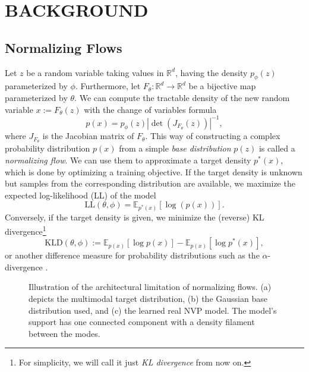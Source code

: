 \documentclass[twoside]{article}
\newcommand{\KLD}{\mathrm{KLD}}
\begin{document}
\section{BACKGROUND}

\subsection{Normalizing Flows}
\label{sec:back_nf}

Let $z$ be a random variable taking values in $\mathds{R}^d$, having the density $p_\phi(z)$ parameterized by $\phi$. Furthermore, let $F_\theta:\mathds{R}^d \rightarrow \mathds{R}^d$ be a bijective map parameterized by $\theta$. We can compute the tractable density of the new random variable $x := F_\theta(z)$ with the change of variables formula
\begin{equation}
	p(x) = p_\phi(z) \left| \det(J_{F_\theta}(z))\right| ^{-1},
\end{equation}
where $J_{F_\theta}$ is the Jacobian matrix of $F_\theta$. This way of constructing a complex probability distribution $p(x)$ from a simple \emph{base distribution} $p(z)$ is called a \emph{normalizing flow}. We can use them to approximate a target density $p^*(x)$, which is done by optimizing a training objective. If the target density is unknown but samples from the corresponding distribution are available, we maximize the expected log-likelihood (LL) of the model
\begin{equation}
    \text{LL}(\theta, \phi) = \mathds{E}_{p^*(x)}\left[ \log\left( p(x)\right) \right].
    \label{equ:def_ll}
\end{equation}
Conversely, if the target density is given, we minimize the (reverse) KL divergence\footnote{For simplicity, we will call it just \emph{KL divergence} from now on.} \citep{Papamakarios2021}
\begin{equation}
    \KLD(\theta, \phi) := \mathds{E}_{p(x)}\left[ \log p(x) \right] - \mathds{E}_{p(x)}\left[ \log p^*(x) \right] ,
    \label{equ:def_rkld}
\end{equation}
or another difference measure for probability distributions such as the $\alpha$-divergence \citep{Hernandez-Lobato2016}.

\begin{figure}
	\centering
	\caption{Illustration of the architectural limitation of normalizing flows. (a) depicts the multimodal target distribution, (b) the Gaussian base distribution used, and (c) the learned real NVP model. The model's support has one connected component with a density filament between the modes.}
	\label{fig:artefacts_demo}
\end{figure}
\end{document}
